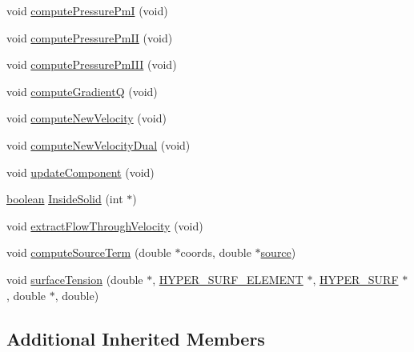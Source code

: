\begin{DoxyCompactItemize}
\item 
void \hyperlink{class_incompress___solver___smooth__3_d___cartesian_a5c843a9e8d5c8096ea0135645e0278ff}{compute\+Pressure\+PmI} (void)
\item 
void \hyperlink{class_incompress___solver___smooth__3_d___cartesian_ade561a891b0c3a3db38ed578e488dae0}{compute\+Pressure\+Pm\+II} (void)
\item 
void \hyperlink{class_incompress___solver___smooth__3_d___cartesian_a363559ad04403ef188665b2006bf93be}{compute\+Pressure\+Pm\+I\+II} (void)
\item 
void \hyperlink{class_incompress___solver___smooth__3_d___cartesian_a8bb3ea8c259d5692ef66fe9699ab9ba2}{compute\+GradientQ} (void)
\item 
void \hyperlink{class_incompress___solver___smooth__3_d___cartesian_aecc3b55bc2b356964135aff82f52d388}{compute\+New\+Velocity} (void)
\item 
void \hyperlink{class_incompress___solver___smooth__3_d___cartesian_af6353428b83cc87520ce05ad0b2cf678}{compute\+New\+Velocity\+Dual} (void)
\item 
void \hyperlink{class_incompress___solver___smooth__3_d___cartesian_a4becbc3b96f04b5c7e531ff1ecceee5f}{update\+Component} (void)
\item 
\hyperlink{cdecs_8h_ad048433382a936258fb49e2ec4f148e1}{boolean} \hyperlink{class_incompress___solver___smooth__3_d___cartesian_a3d1fa018b4f3d657ff3e9d6b8a3176e0}{Inside\+Solid} (int $\ast$)
\item 
void \hyperlink{class_incompress___solver___smooth__3_d___cartesian_adfbcd4f2fed9189d1f8ebbbd03c4bc15}{extract\+Flow\+Through\+Velocity} (void)
\item 
void \hyperlink{class_incompress___solver___smooth__3_d___cartesian_aeb0be785e1af0989e773598e4e442f28}{compute\+Source\+Term} (double $\ast$coords, double $\ast$\hyperlink{class_incompress___solver___smooth___basis_ab571615b4743bbd36e8eea358f7a7eed}{source})
\item 
void \hyperlink{class_incompress___solver___smooth__3_d___cartesian_ac84d66b3a087a5b496bf4e7d5032188b}{surface\+Tension} (double $\ast$, \hyperlink{int_8h_a17e21ae7174174d7a55516f8c9a8f12f}{H\+Y\+P\+E\+R\+\_\+\+S\+U\+R\+F\+\_\+\+E\+L\+E\+M\+E\+NT} $\ast$, \hyperlink{int_8h_acef50fa4757ce0d3f75c97fab5a175bc}{H\+Y\+P\+E\+R\+\_\+\+S\+U\+RF} $\ast$, double $\ast$, double)
\end{DoxyCompactItemize}
\subsection*{Additional Inherited Members}


